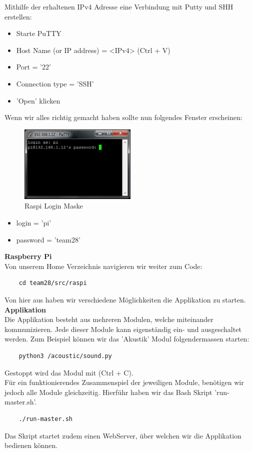 \documentclass[../../main.tex]{subfiles}
\begin{document}
Mithilfe der erhaltenen IPv4 Adresse eine Verbindung mit Putty und SHH erstellen:

\begin{itemize}
    \item Starte PuTTY
    \item Host Name (or IP address) = <IPv4> (Ctrl + V)
    \item Port = '22'
    \item Connection type = 'SSH'
    \item 'Open' klicken
\end{itemize}

Wenn wir alles richtig gemacht haben sollte nun folgendes Fenster erscheinen:
\begin{figure}[H] \centering
    \includegraphics[width=0.5\textwidth]{PuttyRaspiLogin}
    \caption{Raspi Login Maske}
    \label{fig:Login}
\end{figure}

\begin{itemize}
    \item login = 'pi'
    \item password = 'team28'
\end{itemize}

\textbf{Raspberry Pi}\\
Von unserem Home Verzeichnis navigieren wir weiter zum Code: \\
\begin{lstlisting}
    cd team28/src/raspi
\end{lstlisting}
Von hier aus haben wir verschiedene Möglichkeiten die Applikation zu starten. \\

\textbf{Applikation}\\
Die Applikation besteht aus mehreren Modulen, welche miteinander kommunizieren. Jede dieser Module kann eigenständig ein- und ausgeschaltet werden. Zum Beispiel können wir das 'Akustik' Modul folgendermassen starten: \\
\begin{lstlisting}
    python3 /acoustic/sound.py
\end{lstlisting}
Gestoppt wird das Modul mit (Ctrl + C).\\
Für ein funktionierendes Zusammenspiel der jeweiligen Module, benötigen wir jedoch alle Module gleichzeitig. Hierführ haben wir das Bash Skript 'run-master.sh'. \\
\begin{lstlisting}
    ./run-master.sh
\end{lstlisting}
Das Skript startet zudem einen WebServer, über welchen wir die Applikation bedienen können. \\
\end{document}
